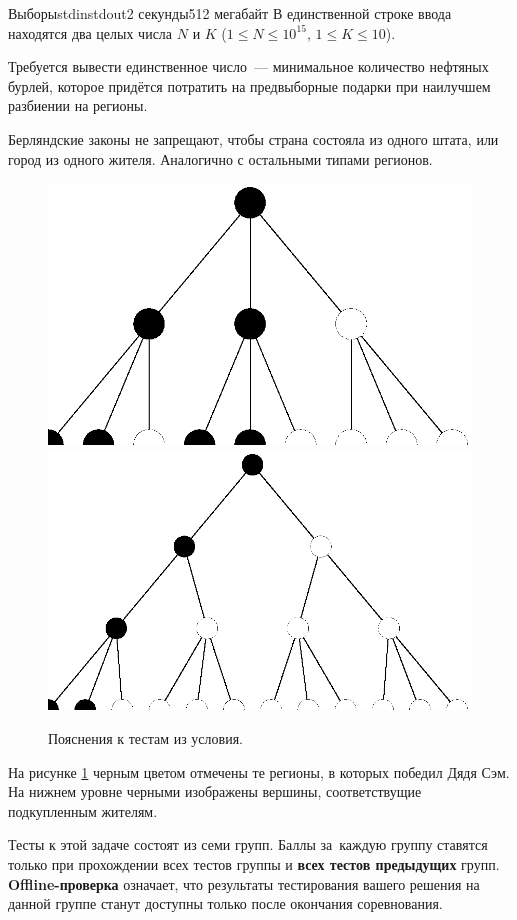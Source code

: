 \begin{problem}{Выборы}{stdin}{stdout}{2 секунды}{512 мегабайт}
\InputFile
В единственной строке ввода находятся два целых числа $N$ и $K$ ($1 \leqslant N \leqslant 10^{15}$, $1 \leqslant K \leqslant 10$).

\OutputFile
Требуется вывести единственное число~--- минимальное количество нефтяных бурлей, которое придётся потратить на предвыборные подарки при наилучшем разбиении на регионы.

\Examples

\begin{example}
%
%
\end{example}

\Note
Берляндские законы не запрещают, чтобы страна состояла из одного штата, или город из одного жителя. Аналогично с остальными типами регионов. 


\begin{figure}[!h] 
\centering
  \includegraphics[width=.4\linewidth]{pic-1.eps}\phantom{aaaa} 
  \includegraphics[width=.4\linewidth]{pic-2.eps}
\caption{Пояснения к тестам из условия.}
\label{fig1}
\end{figure}

На рисунке \ref{fig1} черным цветом отмечены те регионы, в которых победил Дядя Сэм. На нижнем уровне черными изображены вершины, соответствущие подкупленным жителям.

\Scoring

Тесты к этой задаче состоят из семи групп. Баллы за~каждую группу ставятся только при прохождении всех тестов группы и \textbf{всех тестов предыдущих} групп. \textbf{Offline-проверка} означает, что результаты тестирования вашего решения на данной группе станут доступны только после окончания соревнования.
\medskip

\begingroup
\renewcommand{\arraystretch}{1.5}


\end{problem}
